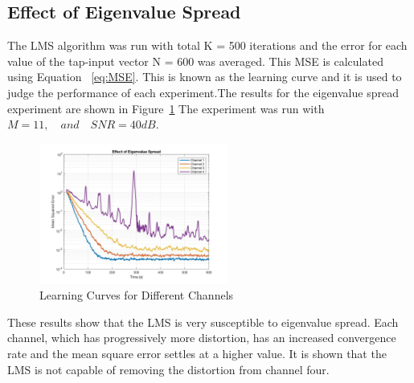 \documentclass[journal]{IEEEtran}
\begin{document}
\subsection{Effect of Eigenvalue Spread}
The LMS algorithm was run with total K = 500 iterations and the error for each value of the tap-input vector N = 600 was averaged.
This MSE is calculated using Equation ~\ref{eq:MSE}. This is known as the learning curve and it is used to judge the
performance of each experiment.The results for the eigenvalue spread experiment are shown in Figure~\ref{fig:eigenspread}
The experiment was run with $M = 11, \quad and \quad SNR = 40dB$.

\begin{figure}[H]
  \centering
  \captionsetup{justification=centering,font = small}
  \includegraphics[width=0.55\textwidth, right] {Plots/Project1_Part1_2.jpg}
  \caption{Learning Curves for Different Channels}
    \label{fig:eigenspread}
\end{figure}
These results show that the LMS is very susceptible to eigenvalue spread. Each channel,
which has progressively more distortion, has an increased convergence rate and the mean square
error settles at a higher value. It is shown that the LMS is not capable of
removing the distortion from channel four.
\end{document}
